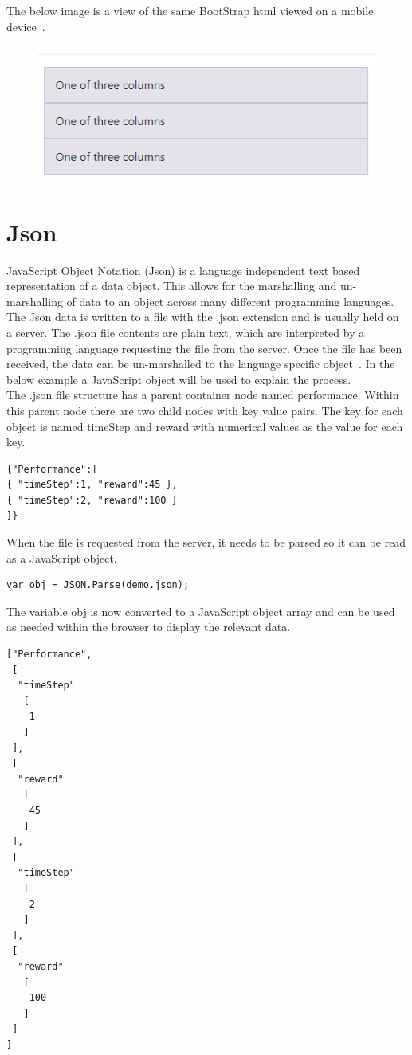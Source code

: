 The below image is a view of the same BootStrap html viewed on a mobile device~\cite{BootstrapGridExample:online}.
\begin{figure}[H]
	\centering
	\includegraphics[width=0.7\linewidth]{img/BootstrapMobile}
	\caption{}
	\label{fig:bootstrapmobile}
\end{figure}

\section{Json}
JavaScript Object Notation (Json) is a language independent text based representation of a data object. This allows for the marshalling and un-marshalling of data to an object across many different programming languages. The Json data is written to a file with the .json extension and is usually held on a server. The .json file contents are plain text, which are interpreted by a programming language requesting the file from the server. Once the file has been received, the data can be un-marshalled to the language specific object~\cite{JSON:online}. In the below example a JavaScript object will be used to explain the process.\\

The .json file structure has  a parent container node named performance. Within this parent node there are two child nodes with key value pairs. The key for each object is named timeStep and reward with numerical values as the value for each key.~\cite{JSONstring:online}\\
\begin{verbatim}
{"Performance":[
{ "timeStep":1, "reward":45 },
{ "timeStep":2, "reward":100 }
]}
\end{verbatim}
When the file is requested from the server, it needs to be parsed so it can be read as a JavaScript object.

\begin{verbatim}
var obj = JSON.Parse(demo.json);
\end{verbatim}
The variable obj is now converted to a JavaScript object array and can be used as needed within the browser to display the relevant data.
\begin{verbatim}
["Performance",
 [
  "timeStep"
   [
    1
   ]
 ],
 [
  "reward"
   [
    45
   ]
 ],
 [
  "timeStep"
   [
    2
   ]
 ],
 [
  "reward"
   [
    100
   ]
 ]
]
\end{verbatim}
